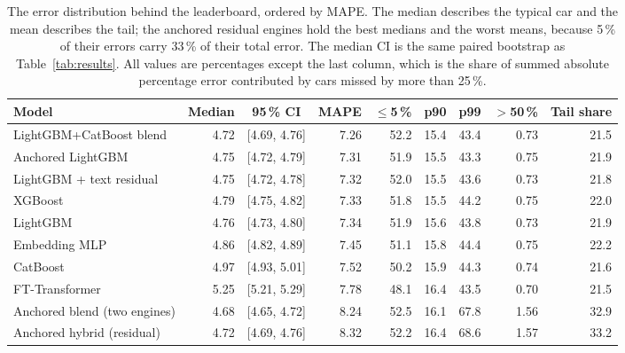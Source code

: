\begin{table}[t]
\centering
\caption{The error distribution behind the leaderboard, ordered by MAPE. The median describes the typical car and the mean describes the tail; the anchored residual engines hold the best medians and the worst means, because 5\,\% of their errors carry 33\,\% of their total error. The median CI is the same paired bootstrap as Table~\ref{tab:results}. All values are percentages except the last column, which is the share of summed absolute percentage error contributed by cars missed by more than 25\,\%.}
\label{tab:profile}
\footnotesize\setlength{\tabcolsep}{5pt}
\begin{tabular}{lrcrrrrrr}
\toprule
Model & Median & 95\,\% CI & MAPE & $\le$5\,\% & p90 & p99 & $>$50\,\% & Tail share \\
\midrule
LightGBM+CatBoost blend & 4.72 & [4.69, 4.76] & 7.26 & 52.2 & 15.4 & 43.4 & 0.73 & 21.5 \\
Anchored LightGBM & 4.75 & [4.72, 4.79] & 7.31 & 51.9 & 15.5 & 43.3 & 0.75 & 21.9 \\
LightGBM + text residual & 4.75 & [4.72, 4.78] & 7.32 & 52.0 & 15.5 & 43.6 & 0.73 & 21.8 \\
XGBoost & 4.79 & [4.75, 4.82] & 7.33 & 51.8 & 15.5 & 44.2 & 0.75 & 22.0 \\
LightGBM & 4.76 & [4.73, 4.80] & 7.34 & 51.9 & 15.6 & 43.8 & 0.73 & 21.9 \\
Embedding MLP & 4.86 & [4.82, 4.89] & 7.45 & 51.1 & 15.8 & 44.4 & 0.75 & 22.2 \\
CatBoost & 4.97 & [4.93, 5.01] & 7.52 & 50.2 & 15.9 & 44.3 & 0.74 & 21.6 \\
FT-Transformer & 5.25 & [5.21, 5.29] & 7.78 & 48.1 & 16.4 & 43.5 & 0.70 & 21.5 \\
Anchored blend (two engines) & 4.68 & [4.65, 4.72] & 8.24 & 52.5 & 16.1 & 67.8 & 1.56 & 32.9 \\
Anchored hybrid (residual) & 4.72 & [4.69, 4.76] & 8.32 & 52.2 & 16.4 & 68.6 & 1.57 & 33.2 \\
\bottomrule
\end{tabular}
\end{table}
